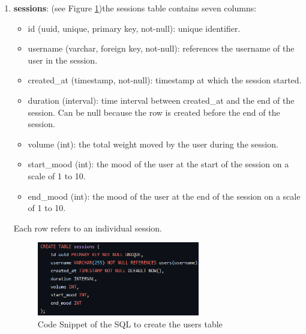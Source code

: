 \begin{enumerate}
                \item \textbf{sessions}:  (see Figure \ref{fig:sessions})the sessions table contains seven columns:
                    \begin{itemize}
                        \item id (uuid, unique, primary key, not-null): unique identifier.
                        \item username (varchar, foreign key, not-null): references the username of the user in the session.
                        \item created\_at (timestamp, not-null): timestamp at which the session started.
                        \item duration (interval): time interval between created\_at and the end of the session. Can be null because the row is created before the end of the session.
                        \item volume (int): the total weight moved by the user during the session.
                        \item start\_mood (int): the mood of the user at the start of the session on a scale of 1 to 10.
                        \item end\_mood (int): the mood of the user at the end of the session on a scale of 1 to 10.
                    \end{itemize}
                    Each row refers to an individual session.
                    \begin{figure}[htbp]
                            \centering
                            \includegraphics[width=0.67\textwidth]{figures/sessions.png}
                            \caption{Code Snippet of the SQL to create the users table}
                            \label{fig:sessions}
                    \end{figure}
                

\end{enumerate}
